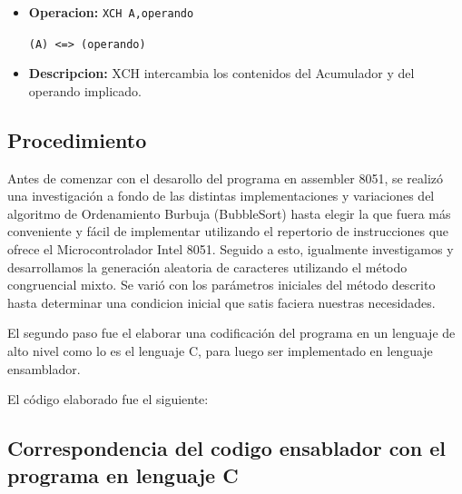 \documentclass[doc, donotrepeattitle, biblatex, apacite]{apa6}
\begin{document}
\begin{itemize}
\item \textbf{Operacion:} \texttt{XCH A,operando}

\texttt{(A) <=> (operando)}
\item \textbf{Descripcion:} XCH intercambia los contenidos del Acumulador y del operando implicado.
\end{itemize}

\subsection{Procedimiento}
Antes de comenzar con el desarollo del programa en assembler 8051, se realizó una investigación a fondo de las distintas 
implementaciones y variaciones del algoritmo de Ordenamiento Burbuja (BubbleSort) 
hasta elegir la que fuera más conveniente y fácil de implementar utilizando el repertorio de 
instrucciones que ofrece el Microcontrolador Intel 8051. 
Seguido a esto, igualmente investigamos y desarrollamos la generación aleatoria de caracteres utilizando el método congruencial mixto. 
Se varió con los parámetros iniciales del método descrito hasta determinar una condicion inicial que satis faciera nuestras necesidades.

El segundo paso fue el elaborar una codificación del programa en un lenguaje de alto nivel
como lo es el lenguaje C, para luego ser implementado en lenguaje ensamblador. 

\newpage
El código elaborado
fue el siguiente:
\subsection{Correspondencia del codigo ensablador con el programa en lenguaje C}


\newpage
\end{document}
